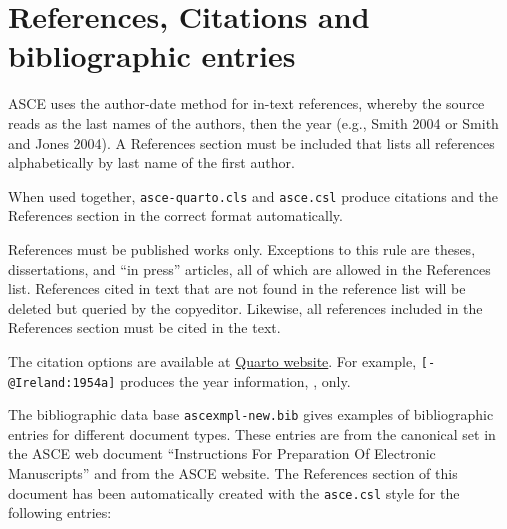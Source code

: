 \documentclass[Journal,LineNumbers]{ascelike-new}
\begin{document}
\section{References, Citations and bibliographic
entries}\label{references-citations-and-bibliographic-entries}

ASCE uses the author-date method for in-text references, whereby the
source reads as the last names of the authors, then the year (e.g.,
Smith 2004 or Smith and Jones 2004). A References section must be
included that lists all references alphabetically by last name of the
first author.

When used together, \texttt{asce-quarto.cls} and \texttt{asce.csl}
produce citations and the References section in the correct format
automatically.

References must be published works only. Exceptions to this rule are
theses, dissertations, and ``in press'' articles, all of which are
allowed in the References list. References cited in text that are not
found in the reference list will be deleted but queried by the
copyeditor. Likewise, all references included in the References section
must be cited in the text.

The citation options are available at
\href{https://quarto.org/docs/authoring/citations.html}{Quarto website}.
For example, \texttt{{[}-@Ireland:1954a{]}} produces the year
information, \citeyearpar{Ireland:1954a}, only.

The bibliographic data base \texttt{ascexmpl-new.bib} gives examples of
bibliographic entries for different document types. These entries are
from the canonical set in the ASCE web document ``Instructions For
Preparation Of Electronic Manuscripts'' and from the ASCE website. The
References section of this document has been automatically created with
the \texttt{asce.csl} style for the following entries:
\end{document}
